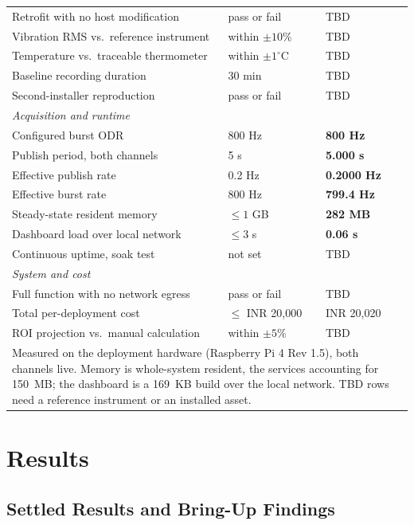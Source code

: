 \documentclass[conference]{IEEEtran}
\begin{document}
\begin{table}[t]
\begin{tabular}{|p{3.4cm}|p{1.9cm}|p{1.4cm}|}
Retrofit with no host modification & pass or fail & TBD \\
Vibration RMS vs.\ reference instrument & within $\pm 10\%$ & TBD \\
Temperature vs.\ traceable thermometer & within $\pm 1^{\circ}$C & TBD \\
Baseline recording duration & 30 min & TBD \\
Second-installer reproduction & pass or fail & TBD \\
\hline
\multicolumn{3}{|l|}{\emph{Acquisition and runtime}} \\
\hline
Configured burst ODR & 800 Hz & \textbf{800 Hz} \\
Publish period, both channels & 5 s & \textbf{5.000 s} \\
Effective publish rate & 0.2 Hz & \textbf{0.2000 Hz} \\
Effective burst rate & 800 Hz & \textbf{799.4 Hz} \\
Steady-state resident memory & $\leq 1$ GB & \textbf{282 MB} \\
Dashboard load over local network & $\leq 3$ s & \textbf{0.06 s} \\
Continuous uptime, soak test & not set & TBD \\
\hline
\multicolumn{3}{|l|}{\emph{System and cost}} \\
\hline
Full function with no network egress & pass or fail & TBD \\
Total per-deployment cost & $\leq$ INR 20,000 & INR 20,020 \\
ROI projection vs.\ manual calculation & within $\pm 5\%$ & TBD \\
\hline
\multicolumn{3}{p{0.95\columnwidth}}{\scriptsize Measured on the deployment
hardware (Raspberry Pi 4 Rev 1.5), both channels live. Memory is
whole-system resident, the services accounting for 150~MB; the dashboard is
a 169~KB build over the local network. TBD rows need a reference instrument
or an installed asset.} \\
\end{tabular}
\end{table}

\section{Results}
\label{sec:results}

\subsection{Settled Results and Bring-Up Findings}
\end{document}

